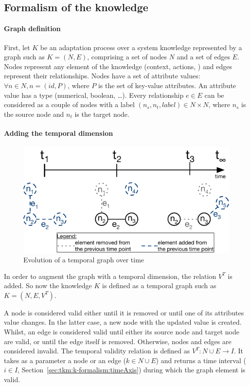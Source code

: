 \subsection{Formalism of the knowledge}
\label{sec:tkm:k-formalism:formalism}
 
\paragraph{Graph definition}
First, let $K$ be an adaptation process over a system \gls{knowledge} represented by a graph such as $K = (N, E)$, comprising a set of nodes $N$ and a set of edges $E$.
Nodes represent any element of the knowledge (context, actions, \etc{}) and edges represent their relationships.
Nodes have a set of attribute values: $\forall n \in N, n = (id, P)$, where $P$ is the set of key-value attributes.
An attribute value has a type (numerical, boolean, \ldots). 
Every relationship $e \in E$ can be considered as a couple of nodes with a label $(n_s, n_t, label) \in N \times N$, where $n_s$ is the source node and $n_t$ is the target node.

\paragraph{Adding the temporal dimension}

\begin{figure}
   \centering
	\includegraphics{img/chapt-tkm/formalism/validityExample}
	\caption{Evolution of a temporal graph over time}
	\label{fig:tkm:validityEx}
\end{figure}

In order to augment the graph with a temporal dimension, the relation $V^T$ is added.
So now the knowledge $K$ is defined as a temporal graph such as $K = (N, E, V^T)$.

A node is considered valid either until it is removed or until one of its attributes value changes. 
In the latter case, a new node with the updated value is created.
Whilst, an edge is considered valid until either its source node and target node are valid, or until the edge itself is removed.
Otherwise, nodes and edges are considered invalid.
The temporal validity relation is defined as $V^T: N \cup E \rightarrow I$.
It takes as a parameter a node or an edge ($k \in N \cup E$) and returns a time interval ($i \in I$, \cf Section~\ref{sec:tkm:k-formalism:timeAxis}) during which the graph element is valid.


